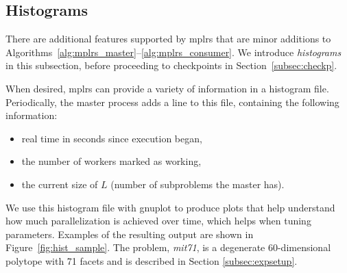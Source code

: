 \documentclass[a4paper,11pt]{article}   \usepackage{authblk} \usepackage[top=1.9cm,bottom=1.9cm,left=1.9cm,right=1.9cm]{geometry}
\newcommand{\progname}{\textsf}
\newcommand{\mplrs}{\progname{mplrs}\xspace}
\newcommand{\gnuplot}{\progname{gnuplot}\xspace}
\newcommand{\polytope}{\emph}
\newcommand{\mitseven}{\polytope{mit71}\xspace}
\begin{document}
\subsection{Histograms}
\label{subsec:histo}

There are additional features supported by \mplrs that
are minor additions to 
Algorithms~\ref{alg:mplrs_master}--\ref{alg:mplrs_consumer}.
We introduce \emph{histograms} in this subsection, before proceeding
to checkpoints in Section~\ref{subsec:checkp}.

When desired, \mplrs can provide a variety of information in a
histogram file.  Periodically, the master process
adds a line to this file, containing the following information:
\begin{itemize}
 \item real time in seconds since execution began,
 \item the number of workers marked as working,
 \item the current size of $L$ (number of subproblems the master has).
\end{itemize}

We use this histogram file with \gnuplot to produce
plots that help understand how much parallelization is achieved over
time, which helps when tuning parameters.  Examples of the resulting output
are shown in Figure~\ref{fig:hist_sample}. The problem, \mitseven, 
is a degenerate 60-dimensional polytope with 71 facets
and is described in
Section \ref{subsec:expsetup}. 
\end{document}
